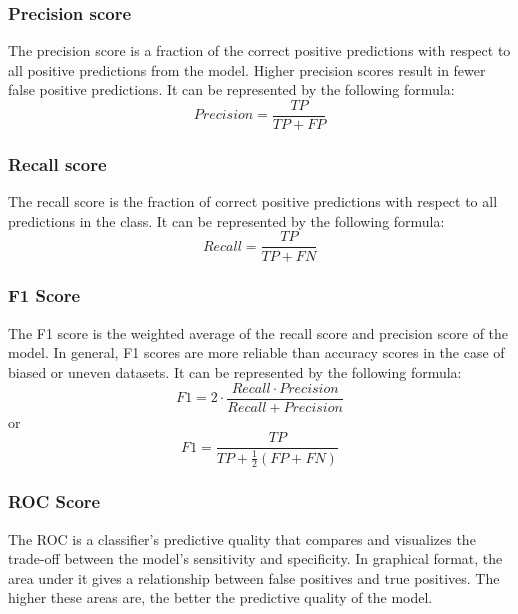 \documentclass[a4paper,fleqn]{cas-dc}
\begin{document}
\subsubsection{Precision score}\label{subsubsec:precision_score}
The precision score is a fraction of the correct positive predictions with respect to all positive predictions from the model. Higher precision scores result in fewer false positive predictions. It can be represented by the following formula:
\begin{equation*}\label{eq:precision_score}
    Precision = \frac{TP}{TP+FP}
\end{equation*}

\subsubsection{Recall score}\label{subsubsec:recall_score}
The recall score is the fraction of correct positive predictions with respect to all predictions in the class. It can be represented by the following formula:
\begin{equation*}\label{eq:recall_score}
    Recall = \frac{TP}{TP+FN}
\end{equation*}

\subsubsection{F1 Score}\label{subsubsec:f1_score}
The F1 score is the weighted average of the recall score and precision score of the model. In general, F1 scores are more reliable than accuracy scores in the case of biased or uneven datasets. It can be represented by the following formula:
\begin{equation*}\label{eq:f1_score}
    F1 = 2 \cdot \frac{Recall \cdot Precision}{Recall + Precision}
\end{equation*}
or
\begin{equation*}\label{eq:f1_score_2}
    F1 = \frac{TP}{TP+\frac{1}{2}(FP+FN)}
\end{equation*}

\subsubsection{ROC Score}\label{subsubsec:roc_score}
The ROC is a classifier's predictive quality that compares and visualizes the trade-off between the model's sensitivity and specificity. In graphical format, the area under it gives a relationship between false positives and true positives. The higher these areas are, the better the predictive quality of the model.
\end{document}
